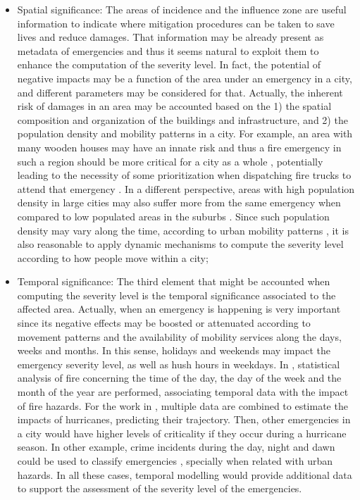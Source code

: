 \begin{refsection}
\begin{itemize}
    \item Spatial significance: The areas of incidence and the influence zone are useful information to indicate where mitigation procedures can be taken to save lives and reduce damages. That information may be already present as metadata of emergencies and thus it seems natural to exploit them to enhance the computation of the severity level. In fact, the potential of negative impacts may be a function of the area under an emergency in a city, and different parameters may be considered for that. Actually, the inherent risk of damages in an area may be accounted based on the 1) the spatial composition and organization of the buildings and infrastructure, and 2) the population density and mobility patterns in a city. For example, an area with many wooden houses may have an innate risk \cite{firespatial1} and thus a fire emergency in such a region should be more critical for a city as a whole \cite{firespatial2}, potentially leading to the necessity of some prioritization when dispatching fire trucks to attend that emergency \cite{costa2020automatic}. In a different perspective, areas with high population density in large cities may also suffer more from the same emergency when compared to low populated areas in the suburbs \cite{firespatial3}. Since such population density may vary along the time, according to urban mobility patterns \cite{mobilityEmergencies1}, it is also reasonable to apply dynamic mechanisms to compute the severity level according to how people move within a city;

    \item Temporal significance: The third element that might be accounted when computing the severity level is the temporal significance associated to the affected area. Actually, when an emergency is happening is very important since its negative effects may be boosted or attenuated according to movement patterns and the availability of mobility services along the days, weeks and months. In this sense, holidays and weekends may impact the emergency severity level, as well as hush hours in weekdays. In \cite{firetemporaldata1}, statistical analysis of fire concerning the time of the day, the day of the week and the month of the year are performed, associating temporal data with the impact of fire hazards. For the work in \cite{hurricanetemporal1}, multiple data are combined to estimate the impacts of hurricanes, predicting their trajectory. Then, other emergencies in a city would have higher levels of criticality if they occur during a hurricane season. In other example, crime incidents during the day, night and dawn could be used to classify emergencies \cite{crimetemporal1}, specially when related with urban hazards. In all these cases, temporal modelling would provide additional data to support the assessment of the severity level of the emergencies.


\end{itemize}
\end{refsection}
